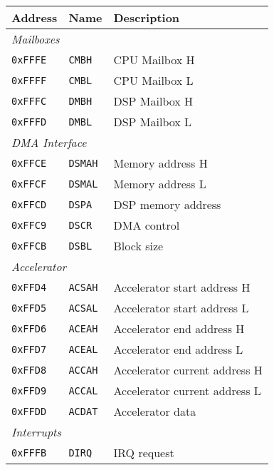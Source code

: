\documentclass[oneside,english,a4paper,10pt,oneside,openany,final]{memoir}
\newcommand{\Address}[1]{\texttt{#1}}
\newcommand{\Register}[1]{\texttt{#1}}
\begin{document}
\begin{table}[htb]
\centering
\begin{tabular}{|l|l|l|}
\hline
\textbf{Address} & \textbf{Name}    & \textbf{Description}          \\ \hline
\multicolumn{3}{|l|}{\textit{Mailboxes}}                            \\ \hline
\Address{0xFFFE} & \Register{CMBH}  & CPU Mailbox H                 \\ \hline
\Address{0xFFFF} & \Register{CMBL}  & CPU Mailbox L                 \\ \hline
\Address{0xFFFC} & \Register{DMBH}  & DSP Mailbox H                 \\ \hline
\Address{0xFFFD} & \Register{DMBL}  & DSP Mailbox L                 \\ \hline
\multicolumn{3}{|l|}{\textit{DMA Interface}}                        \\ \hline
\Address{0xFFCE} & \Register{DSMAH} & Memory address H              \\ \hline
\Address{0xFFCF} & \Register{DSMAL} & Memory address L              \\ \hline
\Address{0xFFCD} & \Register{DSPA}  & DSP memory address            \\ \hline
\Address{0xFFC9} & \Register{DSCR}  & DMA control                   \\ \hline
\Address{0xFFCB} & \Register{DSBL}  & Block size                    \\ \hline
\multicolumn{3}{|l|}{\textit{Accelerator}}                          \\ \hline
\Address{0xFFD4} & \Register{ACSAH} & Accelerator start address H   \\ \hline
\Address{0xFFD5} & \Register{ACSAL} & Accelerator start address L   \\ \hline
\Address{0xFFD6} & \Register{ACEAH} & Accelerator end address H     \\ \hline
\Address{0xFFD7} & \Register{ACEAL} & Accelerator end address L     \\ \hline
\Address{0xFFD8} & \Register{ACCAH} & Accelerator current address H \\ \hline
\Address{0xFFD9} & \Register{ACCAL} & Accelerator current address L \\ \hline
\Address{0xFFDD} & \Register{ACDAT} & Accelerator data              \\ \hline
\multicolumn{3}{|l|}{\textit{Interrupts}}                           \\ \hline
\Address{0xFFFB} & \Register{DIRQ}  & IRQ request                   \\ \hline
\end{tabular}
\end{table}
\end{document}
